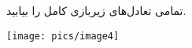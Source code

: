 تمامی تعادل‌های زیربازی کامل را بیابید.
\begin{center}
    \texttt{[image: pics/image4]}
\end{center}

\vspace{-20pt}